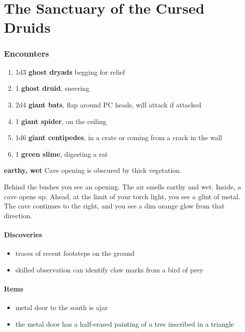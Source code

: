 \chapter*{The Sanctuary of the Cursed Druids}

\subsection{Encounters}
\begin{DndComment}
	\begin{enumerate}
		\item 1d3 \textbf{ghost dryads} begging for relief
		\item 1 \textbf{ghost druid}, sneering
		\item 2d4 \textbf{giant bats}, flap around PC heads, will attack if attacked
		\item 1 \textbf{giant spider}, on the ceiling
		\item 1d6 \textbf{giant centipedes}, in a crate or coming from a crack in
		      the wall
		\item 1 \textbf{green slime}, digesting a rat
	\end{enumerate}
\end{DndComment}

\textbf{earthy, wet}
Cave opening is obscured by thick vegetation.
\begin{DndReadAloud}
	Behind the bushes you see an opening. The air smells earthy and wet. Inside,
	a cave opens up. Ahead, at the limit of your torch light, you see a glint of
	metal. The cave continues to the right, and you see a dim orange glow from
	that direction.
\end{DndReadAloud}
\subsubsection{Discoveries}
\begin{itemize}
	\item traces of recent footsteps on the ground
	\item skilled observation can identify claw marks from a bird of prey
\end{itemize}
\subsubsection{Items}
\begin{itemize}
	\item metal door to the south is ajar
	\item the metal door has a half-erased painting of a tree inscribed in a triangle
\end{itemize}

